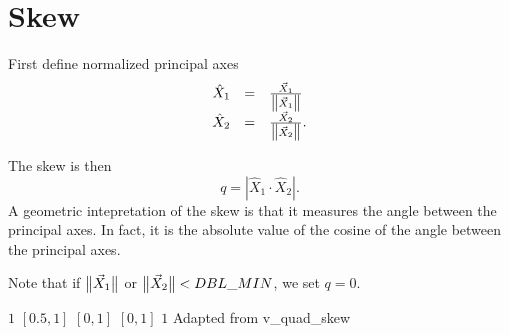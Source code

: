 \section{Skew}

First define normalized principal axes
\[
\begin{array}{lcl}
\hat X_1 &=& \frac {\vec X_1} {\big\lVert{\vec X_1}\big\rVert}\\
\hat X_2 &=& \frac {\vec X_2} {\big\lVert{\vec X_2}\big\rVert}.
\end{array}
\]

The skew is then
\[
q = | \hat X_1 \cdot \hat X_2 |.
\]
A geometric intepretation of the skew is that it measures the angle between the principal axes.
In fact, it is the absolute value of the cosine of the angle between the principal axes.

Note that if $\big\lVert{\vec X_1}\big\rVert$ or $\big\lVert{\vec X_2}\big\rVert < DBL\_MIN$, we set $q = 0$.

%
{$1$}%
{$[0.5,1]$}%
{$[0,1]$}%
{$[0,1]$}%
{$1$}%
{Adapted from \cite{rob:87}}%
{v\_quad\_skew}%

